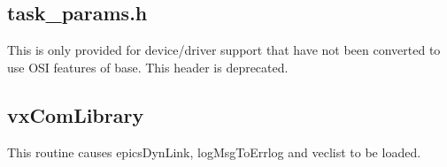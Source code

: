\subsection{task\_params.h}

This is only provided for device/driver support that have not been converted to use OSI features of base.
This header is deprecated.

\subsection{vxComLibrary}

This routine causes epicsDynLink, logMsgToErrlog and veclist to be loaded.
